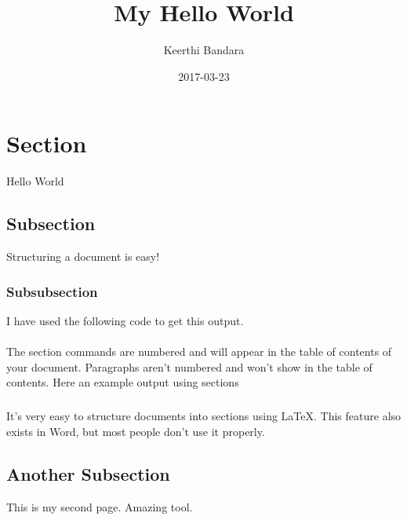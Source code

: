 \documentclass{article}
\title{My Hello World}
\date{2017-03-23}
\author{Keerthi Bandara}
\begin{document}
    \maketitle
    \newpage

    \section{Section}
    Hello World
    
        \subsection{Subsection}
        Structuring a document is easy!

            \subsubsection{Subsubsection}
            I have used the following code to get this output.
            
                
        
        \paragraph{}
        The section commands are numbered and will appear in the table of contents of your document. 
        Paragraphs aren't numbered and won't show in the table of contents. 
        Here an example output using sections
        
        \subparagraph{}
        It's very easy to structure documents into sections using LaTeX. 
        This feature also exists in Word, but most people don't use it properly.
        
        \subsection{Another Subsection}
        
        
               
    \newpage
    This is my second page. Amazing tool.
\end{document}
